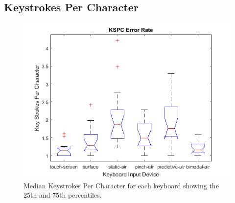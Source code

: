 \subsection{Keystrokes Per Character}
\begin{figure}[h]
	\centering
	\includegraphics{fig_KSPC_boxplot}
	\caption[Keystrokes Per Character Boxplot]{Median Keystrokes Per Character for each keyboard showing the 25th and 75th percentiles.}
	\label{fig_KSPC_boxplot}
\end{figure}

